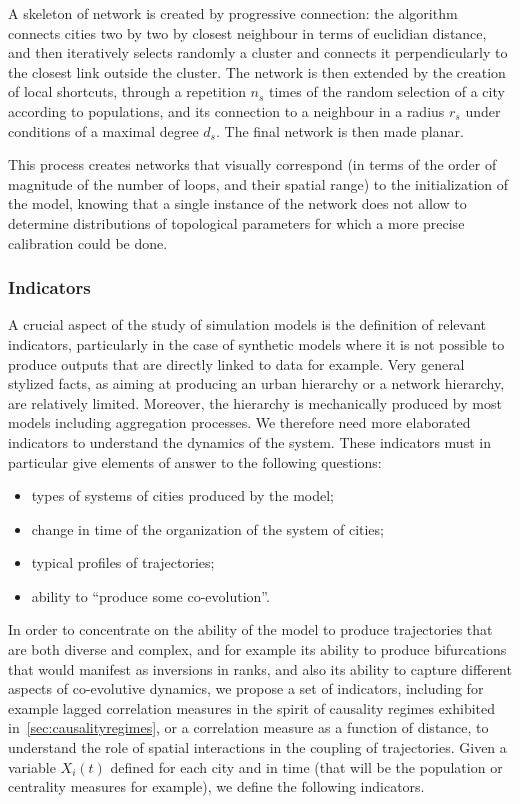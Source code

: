 A skeleton of network is created by progressive connection: the algorithm connects cities two by two by closest neighbour in terms of euclidian distance, and then iteratively selects randomly a cluster and connects it perpendicularly to the closest link outside the cluster. The network is then extended by the creation of local shortcuts, through a repetition $n_s$ times of the random selection of a city according to populations, and its connection to a neighbour in a radius $r_s$ under conditions of a maximal degree $d_s$. The final network is then made planar.


This process creates networks that visually correspond (in terms of the order of magnitude of the number of loops, and their spatial range) to the initialization of the model, knowing that a single instance of the network does not allow to determine distributions of topological parameters for which a more precise calibration could be done.


\subsubsection{Indicators}


A crucial aspect of the study of simulation models is the definition of relevant indicators, particularly in the case of synthetic models where it is not possible to produce outputs that are directly linked to data for example. Very general stylized facts, as aiming at producing an urban hierarchy or a network hierarchy, are relatively limited. Moreover, the hierarchy is mechanically produced by most models including aggregation processes. We therefore need more elaborated indicators to understand the dynamics of the system. These indicators must in particular give elements of answer to the following questions:
\begin{itemize}
	\item types of systems of cities produced by the model;
	\item change in time of the organization of the system of cities;
	\item typical profiles of trajectories;
	\item ability to ``produce some co-evolution''.
\end{itemize}


In order to concentrate on the ability of the model to produce trajectories that are both diverse and complex, and for example its ability to produce bifurcations that would manifest as inversions in ranks, and also its ability to capture different aspects of co-evolutive dynamics, we propose a set of indicators, including for example lagged correlation measures in the spirit of causality regimes exhibited in~\ref{sec:causalityregimes}, or a correlation measure as a function of distance, to understand the role of spatial interactions in the coupling of trajectories. Given a variable $X_i(t)$ defined for each city and in time (that will be the population or centrality measures for example), we define the following indicators.


